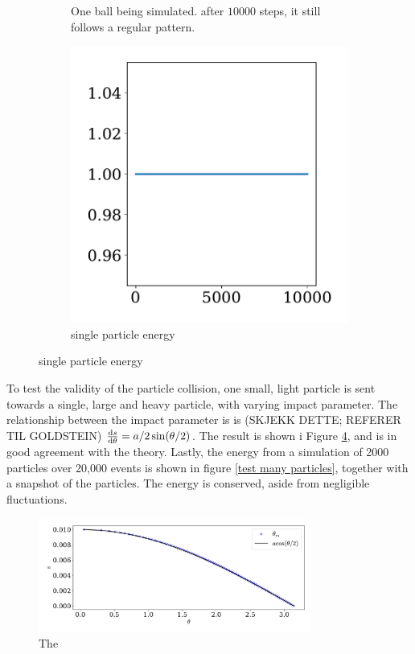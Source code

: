 \documentclass{article}
\begin{document}
\begin{figure}
\begin{subfigure}{.35\textwidth}
                \caption{One ball being simulated. after $10 000$ steps, it still follows a regular pattern.}
                \label{single particle}
            \end{subfigure}
            \begin{subfigure}{.65\textwidth}
                \includegraphics[width=.8\textwidth]{../plots/test_case_one_particle/energy.pdf}
                \caption{single particle energy}
                \label{single particle energy}
            \end{subfigure}
        \end{figure}
        
        To test the validity of the particle collision, one small, light particle is sent towards a single, large and heavy particle, with varying impact parameter. The relationship between the impact parameter is is (SKJEKK DETTE; REFERER TIL GOLDSTEIN) $\dv{s}{\theta} = a / 2 \sin(\theta / 2)$. The result is shown i Figure \ref{scattering}, and is in good agreement with the theory. Lastly, the energy from a simulation of 2000 particles over 20,000 events is shown in figure \ref{test many particles}, together with a snapshot of the particles. The energy is conserved, aside from negligible fluctuations.

        \begin{figure}
            \centering
            \includegraphics[width=0.8\textwidth]{../plots/test_case_collision_angle/collision_angle.pdf}
            \caption{The }
            \label{scattering}
        \end{figure}
\end{document}
